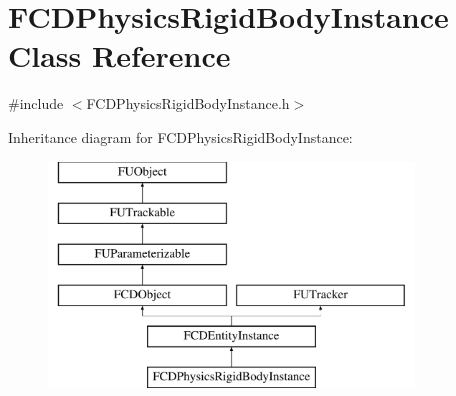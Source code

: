 \hypertarget{classFCDPhysicsRigidBodyInstance}{
\section{FCDPhysicsRigidBodyInstance Class Reference}
\label{classFCDPhysicsRigidBodyInstance}
}


{\ttfamily \#include $<$FCDPhysicsRigidBodyInstance.h$>$}

Inheritance diagram for FCDPhysicsRigidBodyInstance:\begin{figure}[H]
\begin{center}
\leavevmode
\includegraphics[height=6.000000cm]{classFCDPhysicsRigidBodyInstance}
\end{center}
\end{figure}
